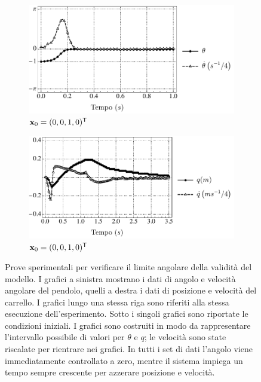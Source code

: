 \begin{figure}
    \centering
    \begin{subfigure}[t]{0.48\textwidth}
        \centering
        \includegraphics[width=\textwidth]{assets/theta-limit-angle1}
        \caption{$\mathbf{x}_0 = (0, 0, 1, 0)^{\mathsf{T}}$}
    \end{subfigure}
    \hfill
    \begin{subfigure}[t]{0.48\textwidth}
        \centering
        \includegraphics[width=\textwidth]{assets/theta-limit-pos1}
        \caption{$\mathbf{x}_0 = (0, 0, 1, 0)^{\mathsf{T}}$}
    \end{subfigure}


    \caption[Limite della validità della linearizzazione]{
        Prove sperimentali per verificare il limite angolare
        della validità del modello.
        I grafici a sinistra mostrano i dati di angolo e velocità angolare del pendolo,
        quelli a destra i dati di posizione e velocità del carrello.
        I grafici lungo una stessa riga sono riferiti alla stessa esecuzione
        dell'esperimento.
        Sotto i singoli grafici sono
        riportate le condizioni iniziali.
        I grafici sono costruiti in modo da rappresentare l'intervallo
        possibile di valori per $\theta$ e $q$; le velocità sono
        state riscalate per rientrare nei grafici.
        In tutti i set di dati l'angolo viene immediatamente controllato
        a zero, mentre il sistema impiega un tempo sempre crescente
        per azzerare posizione e velocità.
    }
    \label{fig:real-theta-limit}
\end{figure}

